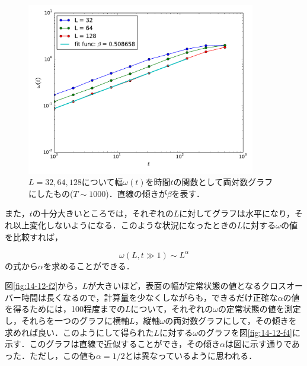 \documentclass{jsarticle}
\begin{document}
\begin{enumerate}
\begin{enumerate}
                \begin{figure}[H]
                    \begin{center}
                        \includegraphics[width=10.0cm]{figure_3.pdf}
                        \caption{$L=32,64,128$について幅$\omega(t)$を時間$t$の関数として両対数グラフにしたもの($T \sim 1000$)．直線の傾きが$\beta$を表す．}
                        \label{fig:14-12-f3}
                    \end{center}
                \end{figure}
                
                また，$t$の十分大きいところでは，それぞれの$L$に対してグラフは水平になり，それ以上変化しないようになる．このような状況になったときの$L$に対する$\omega$の値を比較すれば，
                
                \begin{equation}
                    \omega(L, t \gg 1) \sim L^{\alpha}
                \end{equation}
                の式から$\alpha$を求めることができる．
                
                図\ref{fig:14-12-f2}から，$L$が大きいほど，表面の幅が定常状態の値となるクロスオーバー時間は長くなるので，計算量を少なくしながらも，できるだけ正確な$\alpha$の値を得るためには，100程度までの$L$について，それぞれの$\omega$の定常状態の値を測定し，それらを一つのグラフに横軸$L$，縦軸$\omega$の両対数グラフにして，その傾きを求めれば良い．このようにして得られた$L$に対する$\omega$のグラフを図\ref{fig:14-12-f4}に示す．このグラフは直線で近似することができ，その傾き$\alpha$は図に示す通りであった．ただし，この値も$\alpha=1/2$とは異なっているように思われる．
                

\end{enumerate}
\end{enumerate}
\end{document}
